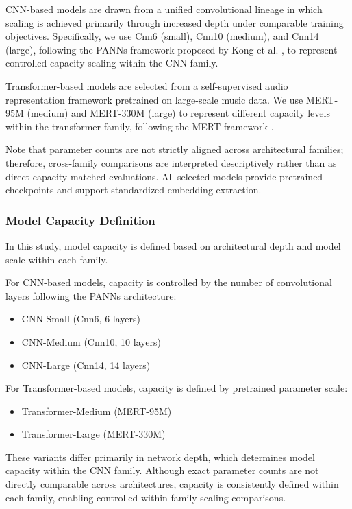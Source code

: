 \documentclass{article}
\begin{document}
CNN-based models are drawn from a unified convolutional lineage in which scaling is achieved
primarily through increased depth under comparable training objectives. 
Specifically, we use Cnn6 (small), Cnn10 (medium), and Cnn14 (large), following the PANNs framework proposed by Kong et al. \cite{kong2020panns}, to represent controlled capacity scaling within the CNN family.

Transformer-based models are selected from a self-supervised audio representation framework
pretrained on large-scale music data. 
We use MERT-95M (medium) and MERT-330M (large) 
to represent different capacity levels within the transformer family, 
following the MERT framework \cite{li2023mert}.

Note that parameter counts are not strictly aligned across architectural families; therefore, cross-family comparisons are interpreted descriptively rather than as direct capacity-matched evaluations.
All selected models provide pretrained checkpoints and support standardized embedding extraction.

\subsubsection{Model Capacity Definition}
In this study, model capacity is defined based on architectural depth and model scale within each family.

For CNN-based models, capacity is controlled by the number of convolutional layers following the PANNs architecture\cite{kong2020panns}:
\begin{itemize}
  \item CNN-Small (Cnn6, 6 layers)
  \item CNN-Medium (Cnn10, 10 layers)
  \item CNN-Large (Cnn14, 14 layers)
\end{itemize}

For Transformer-based models, capacity is defined by pretrained parameter scale:
\begin{itemize}
  \item Transformer-Medium (MERT-95M)
  \item Transformer-Large (MERT-330M)
\end{itemize}

These variants differ primarily in network depth, which determines model capacity within the CNN family.
Although exact parameter counts are not directly comparable across architectures, capacity is consistently defined within each family, enabling controlled within-family scaling comparisons.
\end{document}
